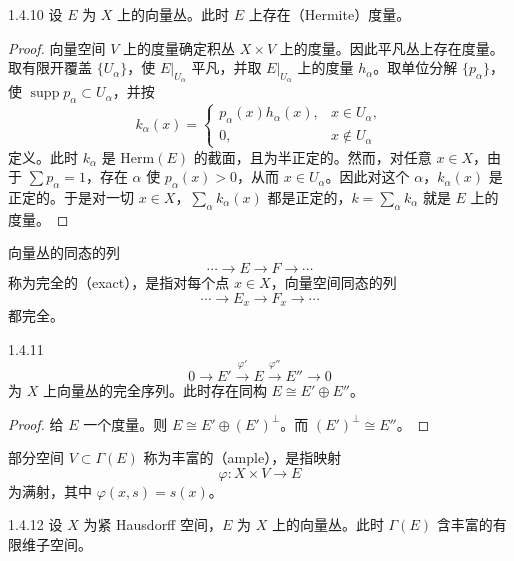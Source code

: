 \begin{lemma*}{1.4.10}
  设 $E$ 为 $X$ 上的向量丛。此时 $E$ 上存在（Hermite）度量。
\end{lemma*}

\begin{proof}
  向量空间 $V$ 上的度量确定积丛 $X\times V$ 上的度量。因此平凡丛上存在度量。取有限开覆盖 $\{U_\alpha\}$，使 $E|_{U_\alpha}$ 平凡，并取 $E|_{U_\alpha}$ 上的度量 $h_\alpha$。取单位分解 $\{p_\alpha\}$，使 $\operatorname{supp}p_\alpha\subset U_\alpha$，并按
\[
k_\alpha(x)=\begin{cases}p_\alpha(x)h_\alpha(x), & x\in U_\alpha,\\ 0, & x\notin U_\alpha\end{cases}
\]
定义。此时 $k_\alpha$ 是 $\mathrm{Herm}(E)$ 的截面，且为半正定的。然而，对任意 $x\in X$，由于 $\sum p_\alpha=1$，存在 $\alpha$ 使 $p_\alpha(x)>0$，从而 $x\in U_\alpha$。因此对这个 $\alpha$，$k_\alpha(x)$ 是正定的。于是对一切 $x\in X$，$\sum_\alpha k_\alpha(x)$ 都是正定的，$k=\sum_\alpha k_\alpha$ 就是 $E$ 上的度量。
\end{proof}

向量丛的同态的列
\[
\cdots\to E\to F\to\cdots
\]
称为完全的（exact），是指对每个点 $x\in X$，向量空间同态的列
\[
\cdots\to E_x\to F_x\to\cdots
\]
都完全。

\begin{corollary*}{1.4.11}
  \[
  0\to E'\xrightarrow{\varphi'}E\xrightarrow{\varphi''}E''\to0
  \]
  为 $X$ 上向量丛的完全序列。此时存在同构 $E\cong E'\oplus E''$。
\end{corollary*}

\begin{proof}
  给 $E$ 一个度量。则 $E\cong E'\oplus(E')^{\perp}$。而 $(E')^{\perp}\cong E''$。
\end{proof}


部分空间 $V\subset\Gamma(E)$ 称为丰富的（ample），是指映射
\[
\varphi\colon X\times V\to E
\]
为满射，其中 $\varphi(x,s)=s(x)$。

\begin{lemma*}{1.4.12}
  设 $X$ 为紧 Hausdorff 空间，$E$ 为 $X$ 上的向量丛。此时 $\Gamma(E)$ 含丰富的有限维子空间。
\end{lemma*}

